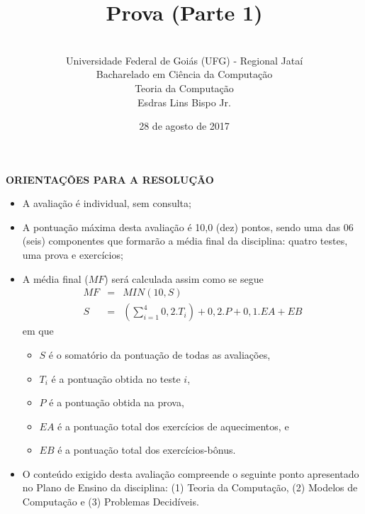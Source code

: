 \documentclass[12pt,a4paper,oneside]{article}
\author{\\Universidade Federal de Goiás (UFG) - Regional  Jataí\\Bacharelado em Ciência da Computação \\Teoria da Computação \\Esdras Lins Bispo Jr.}
\date{28 de agosto de 2017}
\title{\sc \huge Prova (Parte 1)}
\begin{document}
\maketitle

{\bf ORIENTAÇÕES PARA A RESOLUÇÃO}

\small
 
\begin{itemize}
	\item A avaliação é individual, sem consulta;
	\item A pontuação máxima desta avaliação é 10,0 (dez) pontos, sendo uma das 06 (seis) componentes que formarão a média final da disciplina: quatro testes, uma prova e exercícios;
	\item A média final ($MF$) será calculada assim como se segue
	\begin{eqnarray}
		MF & = & MIN(10, S) \nonumber \\
		S & = & (\sum_{i=1}^{4} 0,2.T_i ) + 0,2.P  + 0,1.EA + EB\nonumber
	\end{eqnarray}
	em que 
	\begin{itemize}
		\item $S$ é o somatório da pontuação de todas as avaliações,
		\item $T_i$ é a pontuação obtida no teste $i$,
		\item $P$ é a pontuação obtida na prova,
		\item $EA$ é a pontuação total dos exercícios de aquecimentos, e
		\item $EB$ é a pontuação total dos exercícios-bônus.
	\end{itemize}
	\item O conteúdo exigido desta avaliação compreende o seguinte ponto apresentado no Plano de Ensino da disciplina: (1) Teoria da Computação, (2) Modelos de Computação e (3) Problemas Decidíveis.
\end{itemize}

\begin{center}
\end{center}

\newpage
\end{document}
